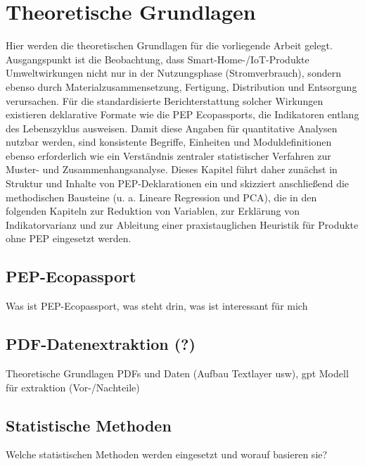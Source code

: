 \chapter{Theoretische Grundlagen}

Hier werden die theoretischen Grundlagen für die vorliegende Arbeit gelegt. 
Ausgangspunkt ist die Beobachtung, dass Smart-Home-/IoT-Produkte Umweltwirkungen nicht nur in der Nutzungsphase (Stromverbrauch), 
sondern ebenso durch Materialzusammensetzung, Fertigung, Distribution und Entsorgung verursachen. 
Für die standardisierte Berichterstattung solcher Wirkungen existieren deklarative Formate wie die PEP Ecopassports, 
die Indikatoren entlang des Lebenszyklus ausweisen. Damit diese Angaben für quantitative Analysen nutzbar werden, 
sind konsistente Begriffe, Einheiten und Moduldefinitionen ebenso erforderlich wie ein Verständnis zentraler 
statistischer Verfahren zur Muster- und Zusammenhangsanalyse. Dieses Kapitel führt daher zunächst in Struktur 
und Inhalte von PEP-Deklarationen ein und skizziert anschließend die methodischen Bausteine 
(u. a. Lineare Regression und PCA), die in den folgenden Kapiteln zur Reduktion von Variablen, 
zur Erklärung von Indikatorvarianz und zur Ableitung einer praxistauglichen Heuristik für Produkte ohne PEP eingesetzt werden.

\section{PEP-Ecopassport}
Was ist PEP-Ecopassport, was steht drin, was ist interessant für mich

\section{PDF-Datenextraktion (?)}
Theoretische Grundlagen PDFs und Daten (Aufbau Textlayer usw), gpt Modell für extraktion (Vor-/Nachteile)

\section{Statistische Methoden}
Welche statistischen Methoden werden eingesetzt und worauf basieren sie?

\subsection{}
